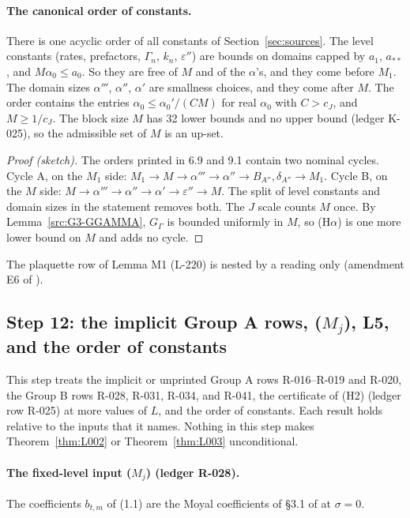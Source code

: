 \paragraph{The canonical order of constants.}
\begin{proposition}\label{src:ORDER-CANON}
There is one acyclic order of all constants of Section~\ref{sec:sources}. The level constants (rates, prefactors, $\Gamma_n$, $k_n$, $\varepsilon''$) are bounds on domains capped by $a_1$, $a_{**}$, and $M\alpha_0\le a_0$. So they are free of $M$ and of the $\alpha$'s, and they come before $M_1$. The domain sizes $\alpha'''$, $\alpha''$, $\alpha'$ are smallness choices, and they come after $M$. The order contains the entries $\alpha_0\le\alpha_0'/(CM)$ for real $\alpha_0$ with $C>c_J$, and $M\ge1/c_J$. The block size $M$ has 32 lower bounds and no upper bound (ledger K-025), so the admissible set of $M$ is an up-set.
\end{proposition}
\begin{proof}[Proof (sketch)]
The orders printed in  6.9 and  9.1 contain two nominal cycles. Cycle A, on the $M_1$ side: $M_1\to M\to\alpha'''\to\alpha''\to B_{A''},\delta_{A''}\to M_1$. Cycle B, on the $M$ side: $M\to\alpha'''\to\alpha''\to\alpha'\to\varepsilon''\to M$. The split of level constants and domain sizes in the statement removes both. The $J$ scale counts $M$ once. By Lemma~\ref{src:G3-GGAMMA}, $G_\Gamma$ is bounded uniformly in $M$, so (H$\alpha$) is one more lower bound on $M$ and adds no cycle.
\end{proof}
The plaquette row of Lemma M1 (L-220) is nested by a reading only (amendment E6 of ).

\subsection{Step 12: the implicit Group A rows, ($M_j$), L5, and the order of constants}\label{sec:src-r7}

This step treats the implicit or unprinted Group A rows R-016--R-019 and R-020, the Group B rows R-028, R-031, R-034, and R-041, the certificate of (H2) (ledger row R-025) at more values of $L$, and the order of constants. Each result holds relative to the inputs that it names. Nothing in this step makes Theorem~\ref{thm:L002} or Theorem~\ref{thm:L003} unconditional.

\paragraph{The fixed-level input ($M_j$) (ledger R-028).}
\begin{convention}\label{conv:src-btm}
The coefficients $b_{t,m}$ of  (1.1) are the Moyal coefficients of \S3.1 of  at $\sigma=0$.
\end{convention}

